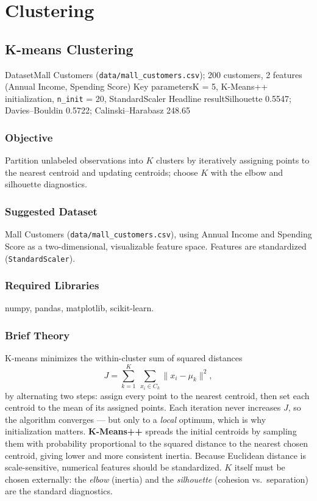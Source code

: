 
\part{Clustering}

\chapter{K-means Clustering}\label{exp:01}


\quickfacts
  {Dataset}{Mall Customers (\texttt{data/mall\_customers.csv}); 200 customers, 2 features (Annual Income, Spending Score)}
  {Key parameters}{K = 5, K-Means++ initialization, \texttt{n\_init} = 20, StandardScaler}
  {Headline result}{Silhouette 0.5547; Davies--Bouldin 0.5722; Calinski--Harabasz 248.65}

\section{Objective}
Partition unlabeled observations into $K$ clusters by iteratively assigning points to the
nearest centroid and updating centroids; choose $K$ with the elbow and silhouette diagnostics.

\section{Suggested Dataset}
Mall Customers (\texttt{data/mall\_customers.csv}), using Annual Income and Spending Score
as a two-dimensional, visualizable feature space. Features are standardized
(\texttt{StandardScaler}).

\section{Required Libraries}
numpy, pandas, matplotlib, scikit-learn.

\section{Brief Theory}
K-means minimizes the within-cluster sum of squared distances
\[
J = \sum_{k=1}^{K}\ \sum_{x_i \in C_k} \lVert x_i - \mu_k \rVert^2 ,
\]
by alternating two steps: assign every point to the nearest centroid, then set each
centroid to the mean of its assigned points. Each iteration never increases $J$, so the
algorithm converges --- but only to a \emph{local} optimum, which is why initialization
matters. \textbf{K-Means++} spreads the initial centroids by sampling them with probability
proportional to the squared distance to the nearest chosen centroid, giving lower and more
consistent inertia. Because Euclidean distance is scale-sensitive, numerical features should
be standardized. $K$ itself must be chosen externally: the \emph{elbow} (inertia) and the
\emph{silhouette} (cohesion vs.\ separation) are the standard diagnostics.

